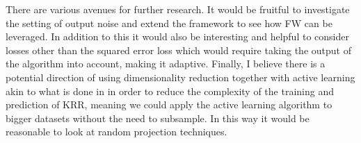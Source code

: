 There are various avenues for further research. It would be fruitful to
investigate the setting of output noise and extend the framework to see how FW
can be leveraged. In addition to this it would also be interesting and helpful to
consider losses other than the squared error loss which would require taking the
output of the algorithm into account, making it adaptive. Finally, I believe
there is a potential direction of using dimensionality reduction together with
active learning akin to what is done in \cite{rudi18} in order to reduce the
complexity of the training and prediction of KRR, meaning we could apply the
active learning algorithm to bigger datasets without the need to subsample. In
this way it would be reasonable to look at random projection techniques.

